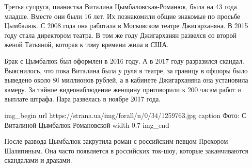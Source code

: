 Третья супруга, пианистка Виталина Цымбаловская-Романюк, была на 43 года
младше. Вместе они были 16 лет. Их познакомили общие знакомые по просьбе
Цымбалюк. С 2008 года она работала в Московском театре Джигарханяна. В
2015 году стала директором театра. В том же году Джигарханян развелся со
второй женой Татьяной, которая к тому времени жила в США.

Брак с Цымбалюк был оформлен в 2016 году. А в 2017 году разразился скандал.
Выяснилось, что пока Виталина была у руля в театре, за границу в офшоры было
выведено около 80 миллионов рублей, а в кабинете Джигарханяна она установила
камеру. За тайное видеонаблюдение женщину приговорили к 200 часам работ и
выплате штрафа. Пара развелась в ноябре 2017 года.

\ifcmt
img_begin 
	url https://strana.ua/img/forall/u/0/34/1259763.jpg
  caption Фото: С Виталиной Цымбалюк-Романовской
	width 0.7
img_end
\fi

После развода Цымбалюк закрутила роман с российским певцом Прохором
Шаляпиным. Она часто появляется в российских ток-шоу, которые
заканчиваются скандалами и драками.

